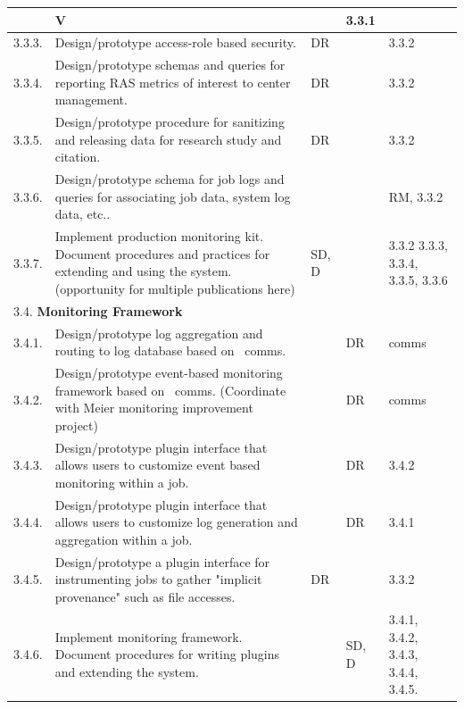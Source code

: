 \begin{longtable}{|p{1cm}|p{10.2cm}|p{1cm}|p{1cm}|p{1.8cm}|}
        & V
        & 
        & 3.3.1 \\
  \hline
  3.3.3.& Design/prototype access-role based security.
        & DR
        & 
        & 3.3.2 \\
  \hline
  3.3.4.& Design/prototype schemas and queries for reporting
          RAS metrics of interest to center management.
        & DR
        & 
        & 3.3.2 \\
  \hline
  3.3.5.& Design/prototype procedure for sanitizing and releasing data
	  for research study and citation.
        & DR
        & 
        & 3.3.2 \\
  \hline
  3.3.6.& Design/prototype schema for job logs and queries for
          associating job data, system log data, etc..
        & 
        & 
        & RM, 3.3.2 \\
  \hline
  3.3.7.& Implement production monitoring kit.
          Document procedures and practices for extending and using the system.
          (opportunity for multiple publications here) 
        & SD, D
        & 
        & 3.3.2 3.3.3, 3.3.4, 3.3.5, 3.3.6 \\
  \hline
  \multicolumn{5}{|l|}{3.4. \textbf{Monitoring Framework}} \\
  \hline
  3.4.1.& Design/prototype log aggregation and routing to log database
	  based on \ngrm\ comms.
        &
        & DR
        & comms \\
  \hline
  3.4.2.& Design/prototype event-based monitoring framework based on
	  \ngrm\ comms.  (Coordinate with Meier monitoring improvement project)
        &
        & DR
        & comms \\
  \hline
  3.4.3.& Design/prototype plugin interface that allows
          users to customize event based monitoring within a job.
        &
        & DR
        & 3.4.2 \\
  \hline
  3.4.4.& Design/prototype plugin interface that allows
          users to customize log generation and aggregation within a job.
        &
        & DR
        & 3.4.1 \\
  \hline
  3.4.5.& Design/prototype a plugin interface for instrumenting jobs
          to gather "implicit provenance" such as file accesses.
        & DR
        & 
        & 3.3.2 \\
  \hline
  3.4.6.& Implement monitoring framework.
          Document procedures for writing plugins and extending the system.
        &
        & SD, D
        & 3.4.1, 3.4.2, 3.4.3, 3.4.4, 3.4.5. \\
  \hline
\end{longtable}

